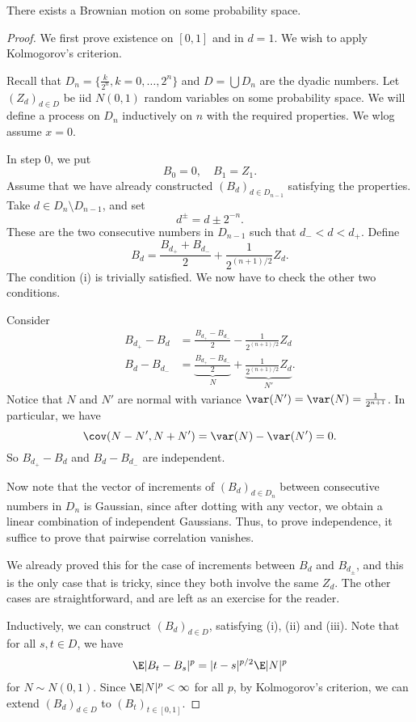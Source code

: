 \documentclass[a4paper]{article}
\begin{document}
\begin{thm}
  There exists a Brownian motion on some probability space.
\end{thm}

\begin{proof}
  We first prove existence on $[0, 1]$ and in $d = 1$. We wish to apply Kolmogorov's criterion.

  Recall that $D_n = \{\frac{k}{2^n}, k = 0, \ldots, 2^n\}$ and $D = \bigcup D_n$ are the dyadic numbers. Let $(Z_d)_{d \in D}$ be iid $N(0, 1)$ random variables on some probability space. We will define a process on $D_n$ inductively on $n$ with the required properties. We wlog assume $x = 0$.

  In step $0$, we put
  \[
    B_0 = 0,\quad B_1 = Z_1.
  \]
  Assume that we have already constructed $(B_d)_{d \in D_{n - 1}}$ satisfying the properties. Take $d \in D_n \setminus D_{n - 1}$, and set
  \[
    d^{\pm} = d \pm 2^{-n}.
  \]
  These are the two consecutive numbers in $D_{n - 1}$ such that $d_- < d < d_+$. Define
  \[
    B_d = \frac{B_{d_+} + B_{d_-}}{2} + \frac{1}{2^{(n + 1)/2}} Z_d.
  \]
  The condition (i) is trivially satisfied. We now have to check the other two conditions.

  Consider
  \begin{align*}
    B_{d_+} - B_d &= \frac{B_{d_+} - B_{d_-}}{2} - \frac{1}{2^{(n + 1)/2}} Z_d\\
    B_d - B_{d_-} &= \underbrace{\frac{B_{d_+} - B_{d_-}}{2}}_N + \underbrace{\frac{1}{2^{(n + 1)/2}} Z_d}_{N'}.
  \end{align*}
  Notice that $N$ and $N'$ are normal with variance $\var(N') = \var(N) = \frac{1}{2^{n + 1}}$. In particular, we have
  \[
    \cov(N - N', N + N') = \var(N) - \var(N') = 0.
  \]
  So $B_{d_+} - B_d$ and $B_d - B_{d_-}$ are independent.

  Now note that the vector of increments of $(B_d)_{d \in D_n}$ between consecutive numbers in $D_n$ is Gaussian, since after dotting with any vector, we obtain a linear combination of independent Gaussians. Thus, to prove independence, it suffice to prove that pairwise correlation vanishes.

  We already proved this for the case of increments between $B_d$ and $B_{d_{\pm}}$, and this is the only case that is tricky, since they both involve the same $Z_d$. The other cases are straightforward, and are left as an exercise for the reader.

  Inductively, we can construct $(B_d)_{d \in D}$, satisfying (i), (ii) and (iii). Note that for all $s, t \in D$, we have
  \[
    \E |B_t - B_s|^p = |t - s|^{p/2} \E |N|^p
  \]
  for $N \sim N(0, 1)$. Since $\E |N|^p < \infty$ for all $p$, by Kolmogorov's criterion, we can extend $(B_d)_{d \in D}$ to $(B_t)_{t \in [0, 1]}$.


\end{proof}
\end{document}
